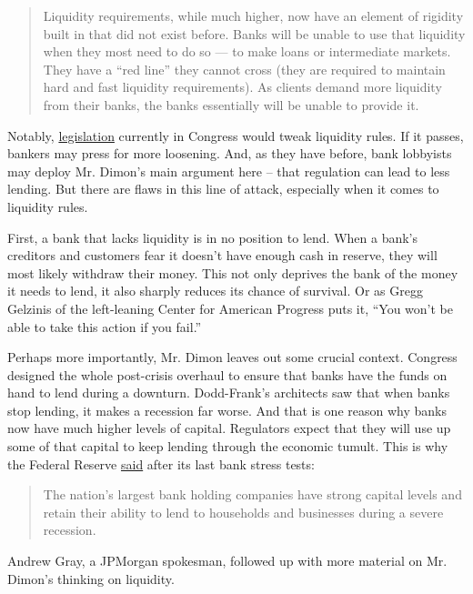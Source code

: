 \begin{quote}
Liquidity requirements, while much higher, now have an element of
rigidity built in that did not exist before. Banks will be unable to use
that liquidity when they most need to do so --- to make loans or
intermediate markets. They have a ``red line'' they cannot cross (they
are required to maintain hard and fast liquidity requirements). As
clients demand more liquidity from their banks, the banks essentially
will be unable to provide it.
\end{quote}

Notably,
\href{https://www.americanbanker.com/news/cheat-sheet-inside-crapos-reg-relief-deal-with-democrats}{legislation}
currently in Congress would tweak liquidity rules. If it passes, bankers
may press for more loosening. And, as they have before, bank lobbyists
may deploy Mr. Dimon's main argument here -- that regulation can lead to
less lending. But there are flaws in this line of attack, especially
when it comes to liquidity rules.

First, a bank that lacks liquidity is in no position to lend. When a
bank's creditors and customers fear it doesn't have enough cash in
reserve, they will most likely withdraw their money. This not only
deprives the bank of the money it needs to lend, it also sharply reduces
its chance of survival. Or as Gregg Gelzinis of the left-leaning Center
for American Progress puts it, ``You won't be able to take this action
if you fail.''

Perhaps more importantly, Mr. Dimon leaves out some crucial context.
Congress designed the whole post-crisis overhaul to ensure that banks
have the funds on hand to lend during a downturn. Dodd-Frank's
architects saw that when banks stop lending, it makes a recession far
worse. And that is one reason why banks now have much higher levels of
capital. Regulators expect that they will use up some of that capital to
keep lending through the economic tumult. This is why the Federal
Reserve
\href{https://www.federalreserve.gov/newsevents/pressreleases/bcreg20170622a.htm}{said}
after its last bank stress tests:

\begin{quote}
The nation's largest bank holding companies have strong capital levels
and retain their ability to lend to households and businesses during a
severe recession.
\end{quote}

Andrew Gray, a JPMorgan spokesman, followed up with more material on Mr.
Dimon's thinking on liquidity.

